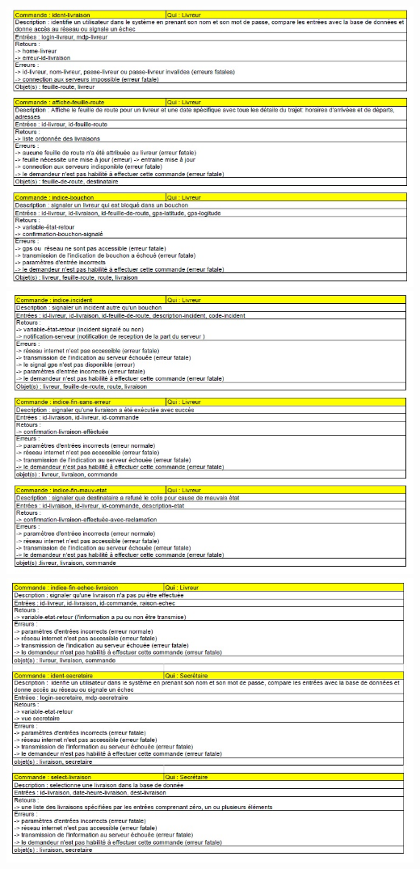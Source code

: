 \documentclass{report}
\begin{document}
\includegraphics[scale = 0.7]{images/DCOM0.jpg}\\
\includegraphics[scale = 0.7]{images/DCOM1.jpg}\\
\includegraphics[scale = 0.7]{images/DCOM2.jpg}\\
\end{document}
